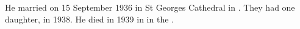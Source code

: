 
He married  on 15 September 1936 in St Georges Cathedral in .\cite{MargPeterMarriage}
They had one daughter, in 1938.\cite{JHBirthNotice}
He died in 1939 in  in the .
